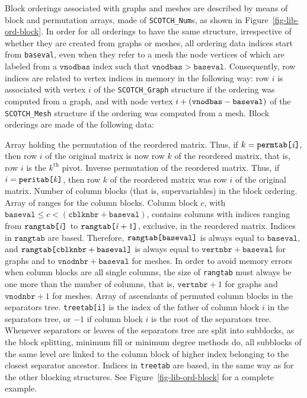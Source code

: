 Block orderings associated with graphs and meshes are described by
means of block and permutation arrays, made of {\tt SCOTCH\_Num}s, as
shown in Figure~\ref{fig-lib-ord-block}. In order for all orderings to
have the same structure, irrespective of whether they are created from
graphs or meshes, all ordering data indices start from {\tt baseval},
even when they refer to a mesh the node vertices of which are labeled
from a $\mathtt{vnodbas}$ index such that $\mathtt{vnodbas} >
\mathtt{baseval}$. Consequently, row indices are related to vertex
indices in memory in the following way: row $i$ is associated with
vertex $i$ of the {\tt SCOTCH\_\lbt Graph} structure if the ordering
was computed from a graph, and with node vertex $i + (\mbox{\tt
vnodbas} - \mathtt{baseval})$ of the {\tt SCOTCH\_\lbt Mesh}
structure if the ordering was computed from a mesh.
Block orderings are made of the following data:
\begin{itemize}
\iteme[{\tt permtab}]
Array holding the permutation of the reordered matrix. Thus, if $k =
\mathtt{permtab}\mbox{\tt [}\mathit{i}\mbox{\tt ]}$, then row $i$ of
the original matrix is now row $k$ of the reordered matrix, that is,
row $i$ is the $k^{\mathrm{th}}$ pivot.
\iteme[{\tt peritab}]
Inverse permutation of the reordered matrix. Thus, if
$i = \mathtt{peritab}\mbox{\tt [}\mathit{k}\mbox{\tt ]}$, then row $k$
of the reordered matrix was row $i$ of the original matrix.
\iteme[{\tt cblknbr}]
Number of column blocks (that is, supervariables) in the block ordering.
\iteme[{\tt rangtab}]
Array of ranges for the column blocks. Column block $c$, with
$\mathtt{baseval} \leq c < (\mathtt{cblknbr} + \mathtt{baseval})$,
contains columns with indices ranging from
$\mathtt{rangtab}\mbox{\tt [}\mathit{i}\mbox{\tt ]}$ to
$\mathtt{rangtab}\mbox{\tt [}\mathit{i} + 1\mbox{\tt ]}$, exclusive,
in the reordered matrix. Indices in $\mathtt{rangtab}$ are
based. Therefore,
$\mathtt{rangtab}\mbox{\tt [}\mathtt{baseval}\mbox{\tt ]}$ is always
equal to $\mathtt{baseval}$, and
$\mathtt{rangtab}\mbox{\tt [}\mathtt{cblknbr} +
\mathtt{baseval}\mbox{\tt ]}$ is always equal to
$\mathtt{vertnbr} + \mathtt{baseval}$ for graphs and
to $\mathtt{vnodnbr} + \mathtt{baseval}$ for meshes.
In order to avoid memory errors when column blocks are all single
columns, the size of {\tt rangtab} must always be one more than the
number of columns, that is, $\mathtt{vertnbr} + 1$ for graphs and
$\mathtt{vnodnbr} + 1$ for meshes.
\iteme[{\tt treetab}]
Array of ascendants of permuted column blocks in the separators tree.
{\tt treetab[i]} is the index of the father of column block $i$ in the
separators tree, or $-1$ if column block $i$ is the root of the
separators tree. Whenever separators or leaves of the separators tree
are split into subblocks, as the block splitting, minimum fill or minimum
degree methods do, all subblocks of the same level are linked to the
column block of higher index belonging to the closest separator
ancestor. Indices in {\tt treetab} are based, in the same way as for
the other blocking structures. See Figure~\ref{fig-lib-ord-block} for
a complete example.
\end{itemize}

